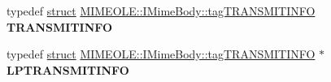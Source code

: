 \begin{DoxyCompactItemize}
\mbox{\label{interface_m_i_m_e_o_l_e_1_1_i_mime_body_a41b33f5a6665c43f800eae0c6d2acbed}} 
typedef \hyperlink{interfacestruct}{struct} \hyperlink{struct_m_i_m_e_o_l_e_1_1_i_mime_body_1_1tag_t_r_a_n_s_m_i_t_i_n_f_o}{M\+I\+M\+E\+O\+L\+E\+::\+I\+Mime\+Body\+::tag\+T\+R\+A\+N\+S\+M\+I\+T\+I\+N\+FO} {\bfseries T\+R\+A\+N\+S\+M\+I\+T\+I\+N\+FO}
\item 
\mbox{\label{interface_m_i_m_e_o_l_e_1_1_i_mime_body_ad96605be46d7fc2cdbd82d0d5af939f0}} 
typedef \hyperlink{interfacestruct}{struct} \hyperlink{struct_m_i_m_e_o_l_e_1_1_i_mime_body_1_1tag_t_r_a_n_s_m_i_t_i_n_f_o}{M\+I\+M\+E\+O\+L\+E\+::\+I\+Mime\+Body\+::tag\+T\+R\+A\+N\+S\+M\+I\+T\+I\+N\+FO} $\ast$ {\bfseries L\+P\+T\+R\+A\+N\+S\+M\+I\+T\+I\+N\+FO}
\end{DoxyCompactItemize}
